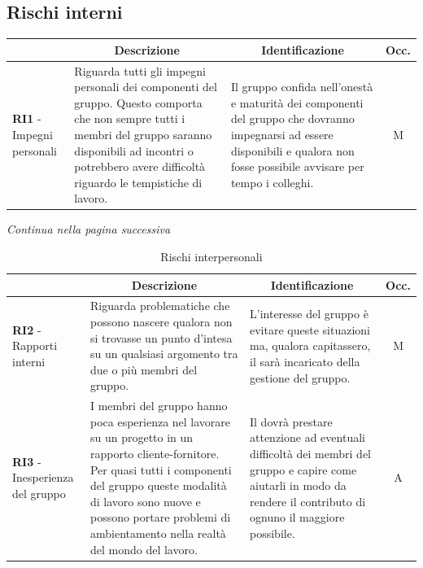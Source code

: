 \subsection{Rischi interni} \label{subsection:rischi_interni}
\begin{table}[H]
  \centering
  \renewcommand{\arraystretch}{1.8}
  \begin{tabular}{p{5.5cm}|p{5cm}|p{5cm}|c}
    \rowcolor[HTML]{125E28} 
    \multicolumn{1}{c}{\color[HTML]{FFFFFF}\textbf{Codice}}
    & \multicolumn{1}{c}{\color[HTML]{FFFFFF}\textbf{Descrizione}}
    & \multicolumn{1}{c}{\color[HTML]{FFFFFF}\textbf{Identificazione}}
    & \color[HTML]{FFFFFF}\textbf{Occ.}\\
    \hline
    \textbf{RI1} - Impegni personali & Riguarda tutti gli impegni personali dei componenti del gruppo. Questo comporta che non sempre tutti i membri del gruppo saranno disponibili ad incontri o potrebbero avere difficoltà riguardo le tempistiche di lavoro. & Il gruppo confida nell'onestà e maturità dei componenti del gruppo che dovranno impegnarsi ad essere disponibili e qualora non fosse possibile avvisare per tempo i colleghi. & M \\
  \end{tabular}
\end{table}
\begin{center}
  \textit{\small Continua nella pagina successiva}
\end{center}
\begin{table}[H]
  \centering
  \renewcommand{\arraystretch}{1.8}
  \begin{tabular}{p{5.5cm}|p{5cm}|p{5cm}|c}
    \rowcolor[HTML]{125E28} 
    \multicolumn{1}{c}{\color[HTML]{FFFFFF}\textbf{Codice}}
    & \multicolumn{1}{c}{\color[HTML]{FFFFFF}\textbf{Descrizione}}
    & \multicolumn{1}{c}{\color[HTML]{FFFFFF}\textbf{Identificazione}}
    & \color[HTML]{FFFFFF}\textbf{Occ.}\\
    \hline
    \textbf{RI2} - Rapporti interni & Riguarda problematiche che possono nascere qualora non si trovasse un punto d'intesa su un qualsiasi argomento tra due o più membri del gruppo. & L'interesse del gruppo è evitare queste situazioni ma, qualora capitassero, il \roleProjectManager{} sarà incaricato della gestione del gruppo. & M \\
    \textbf{RI3} - Inesperienza del gruppo & I membri del gruppo hanno poca esperienza nel lavorare su un progetto in un rapporto cliente-fornitore. Per quasi tutti i componenti del gruppo queste modalità di lavoro sono nuove e possono portare problemi di ambientamento nella realtà del mondo del lavoro. & Il \roleProjectManager{} dovrà prestare attenzione ad eventuali difficoltà dei membri del gruppo e capire come aiutarli in modo da rendere il contributo di ognuno il maggiore possibile. & A \\
  \end{tabular}
  \caption{Rischi interpersonali}
\end{table}

